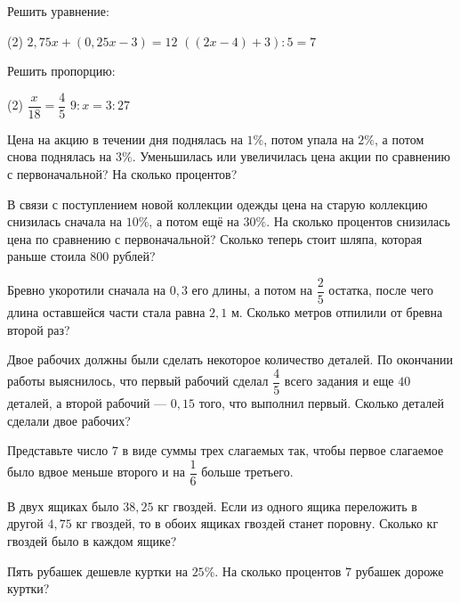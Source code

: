 \begin{class}[number=4]
	\begin{listofex}
		\item Решить уравнение:
		\begin{tasks}(2)
			\task \( 2,75x+(0,25x-3)=12 \)
			\task \( ((2x-4)+3):5=7\)
		\end{tasks}
		\item Решить пропорцию:
		\begin{tasks}(2)
			\task \( \dfrac{x}{18}=\dfrac{4}{5} \)
			\task \( 9:x=3:27\)
		\end{tasks}
		\item Цена на акцию в течении дня поднялась на \(1\%\), потом упала на \(2\%\), а потом снова поднялась на \(3\%\). Уменьшилась или увеличилась цена акции по сравнению с первоначальной? На сколько процентов?
		\item В связи с поступлением новой коллекции одежды цена на старую коллекцию снизилась сначала на \(10\%\), а потом ещё на \(30\%\). На сколько процентов снизилась цена по сравнению с первоначальной? Сколько теперь стоит шляпа, которая раньше стоила \(800\) рублей?
		\item Бревно укоротили сначала на \(0,3\) его длины, а потом на \(\dfrac{2}{5}\) остатка, после чего длина оставшейся части стала равна \(2,1\) м. Сколько метров отпилили от бревна второй раз?
		\item Двое рабочих должны были сделать некоторое количество деталей. По окончании работы выяснилось, что первый рабочий сделал \(\dfrac{4}{5}\) всего задания и еще \(40\) деталей, а второй рабочий --- \(0,15\) того, что выполнил первый. Сколько деталей сделали двое рабочих?
	\end{listofex}
\end{class}

\begin{class}[number=5]
	\begin{listofex}
		\item Представьте число \(7\) в виде суммы трех слагаемых так, чтобы первое слагаемое было вдвое меньше второго и на \(\dfrac{1}{6}\) больше третьего.
		\item В двух ящиках было \(38,25\) кг гвоздей. Если из одного ящика переложить в другой \(4,75\) кг гвоздей, то в обоих ящиках гвоздей станет поровну. Сколько кг гвоздей было в каждом ящике?
		\item Пять рубашек дешевле куртки на \(25\%\). На сколько процентов \(7\) рубашек дороже куртки?
	\end{listofex}
\end{class}


